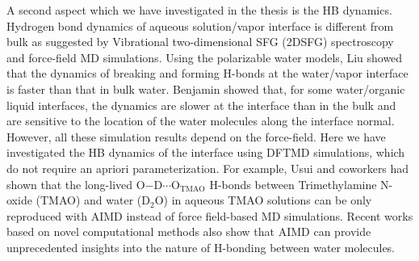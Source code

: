 A second aspect which we have investigated in the thesis is the HB dynamics. 
Hydrogen bond dynamics of aqueous solution/vapor interface is different from bulk as suggested by 
Vibrational two-dimensional SFG (2DSFG) spectroscopy\cite{Asbury2004,Eaves2005,Loparo2006b,Auer2007,Nicodemus2010,Ramasesha2011,NiYicun2012} 
and force-field MD simulations\cite{Luzar1996,AL00,LiuPu2005}. 
Using the polarizable water models, Liu \etal\cite{LiuPu2005} showed that
the dynamics of breaking and forming H-bonds at the water/vapor interface is faster than that in bulk water. 
Benjamin\cite{Benjamin2005} showed that, for some water/organic liquid interfaces, the dynamics are slower at the interface 
than in the bulk and are sensitive to the location of the water molecules along the interface normal.
However, all these simulation results depend on the force-field. 
Here we have investigated 
the HB dynamics of the interface using DFTMD simulations, which do not require an apriori parameterization.
For example, Usui and coworkers\cite{Usui2015} had shown 
that the long-lived O−D$\cdots$O$_{\text{TMAO}}$ H-bonds between Trimethylamine N-oxide (TMAO) and water (D$_2$O) in aqueous TMAO solutions 
can be only reproduced with AIMD instead of force field-based MD simulations. Recent works based on novel \abinitio 
computational methods\cite{Kuehne2007,Mallik2008,Berkelbach2009,Khaliullin2013}
also show that AIMD can provide unprecedented insights into the nature of H-bonding between water molecules.  
%
